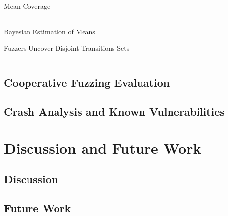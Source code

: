 \documentclass[\HandoutMode,table]{beamer}
\newcommand\figwidth\textwidth
\begin{document}
\begin{frame}{Mean Coverage}
    \begin{table}
        \scriptsize
        \begin{tabular}{l*{4}c}
            
        \end{tabular}
    \end{table}
\end{frame}

\begin{frame}{Bayesian Estimation of Means}
    \renewcommand\figwidth{.33\textwidth}
    \setcounter{subfigure}{0}
    \begin{figure}
    \end{figure}
\end{frame}

\begin{frame}{Fuzzers Uncover Disjoint Transitions Sets}
    \begin{table}
        \begin{tabular}{l c l c}
            
        \end{tabular}
    \end{table}
    \vspace{2\baselineskip}
\end{frame}

\subsection{Cooperative Fuzzing Evaluation}

\subsection{Crash Analysis and Known Vulnerabilities}

\section{Discussion and Future Work}

\subsection*{Discussion}

\subsection*{Future Work}
\end{document}
